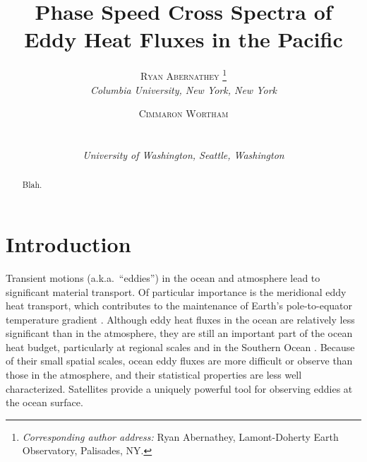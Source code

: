 \documentclass[10pt]{article}
\newcommand{\myabstract}{Blah.}
\begin{document}
%
%
\title{\textbf{\large{Phase Speed Cross Spectra of Eddy Heat Fluxes in the Pacific}}}
%
%
\author{\textsc{Ryan Abernathey}
				\thanks{\textit{Corresponding author address:} 
				Ryan Abernathey, Lamont-Doherty Earth Observatory, 
				Palisades, NY. 
				}\\
\textit{\footnotesize{Columbia University, New York, New York}}
\and 
\centerline{\textsc{Cimmaron Wortham}}\\%
\centerline{\textit{\footnotesize{University of Washington, Seattle, Washington}}}
}
%
{
\twocolumn[
\begin{@twocolumnfalse}
\amstitle

\begin{center}
\begin{minipage}{13.0cm}
\begin{abstract}
	\myabstract
	\newline
	\begin{center}
		\rule{38mm}{0.2mm}
	\end{center}
\end{abstract}
\end{minipage}
\end{center}
\end{@twocolumnfalse}
]
}
{
\amstitle

\begin{abstract}
\myabstract
\end{abstract}

\newpage
}

\section{Introduction}

Transient motions (a.k.a.~``eddies'') in the ocean and atmosphere lead to significant material transport. Of particular importance is the meridional eddy heat transport, which contributes to the maintenance of Earth's pole-to-equator temperature gradient \citep{TrenberthCaron2001,Wunsch2005}. Although eddy heat fluxes in the ocean are relatively less significant than in the atmosphere, they are still an important part of the ocean heat budget, particularly at regional scales and in the Southern Ocean \citep{JayneMarotzke2002,WhatElse?}. Because of their small spatial scales, ocean eddy fluxes are more difficult or observe than those in the atmosphere, and their statistical properties are less well characterized. Satellites provide a uniquely powerful tool for observing eddies at the ocean surface.
\end{document}
